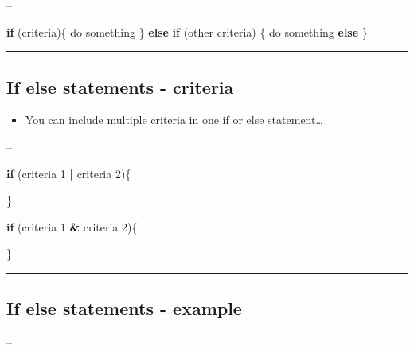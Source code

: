 \documentclass[]{article}
\newenvironment{Shaded}{\begin{snugshade}}{\end{snugshade}}
\newcommand{\ControlFlowTok}[1]{\textcolor[rgb]{0.13,0.29,0.53}{\textbf{#1}}}
\newcommand{\DecValTok}[1]{\textcolor[rgb]{0.00,0.00,0.81}{#1}}
\newcommand{\NormalTok}[1]{#1}
\newcommand{\OperatorTok}[1]{\textcolor[rgb]{0.81,0.36,0.00}{\textbf{#1}}}
\newcommand{\StringTok}[1]{\textcolor[rgb]{0.31,0.60,0.02}{#1}}
\providecommand{\tightlist}{%
  \setlength{\itemsep}{0pt}\setlength{\parskip}{0pt}}
\begin{document}
--

\begin{Shaded}
\begin{Highlighting}[]
\ControlFlowTok{if}\NormalTok{ (criteria)\{}
\NormalTok{  do something}
\NormalTok{\} }\ControlFlowTok{else} \ControlFlowTok{if}\NormalTok{ (other criteria) \{}
\NormalTok{  do something }\ControlFlowTok{else}
\NormalTok{\}}
\end{Highlighting}
\end{Shaded}

\begin{center}\rule{0.5\linewidth}{\linethickness}\end{center}

\hypertarget{if-else-statements---criteria}{%
\subsection{If else statements -
criteria}\label{if-else-statements---criteria}}

\begin{itemize}
\tightlist
\item
  You can include multiple criteria in one if or else statement\ldots{}
\end{itemize}

--

\begin{Shaded}
\begin{Highlighting}[]
\ControlFlowTok{if}\NormalTok{ (criteria }\DecValTok{1} \OperatorTok{|}\StringTok{ }\NormalTok{criteria }\DecValTok{2}\NormalTok{)\{}
  
\NormalTok{\}}

\ControlFlowTok{if}\NormalTok{ (criteria }\DecValTok{1} \OperatorTok{&}\StringTok{ }\NormalTok{criteria }\DecValTok{2}\NormalTok{)\{}
  
\NormalTok{\}}
\end{Highlighting}
\end{Shaded}

\begin{center}\rule{0.5\linewidth}{\linethickness}\end{center}

\hypertarget{if-else-statements---example}{%
\subsection{If else statements -
example}\label{if-else-statements---example}}

--
\end{document}
